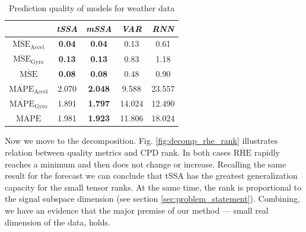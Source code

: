 \documentclass[referee, pdflatex]{sn-jnl}
\theoremstyle{definition}
\theoremstyle{plain}
\begin{document}
	\def\arraystretch{1.1}
	\begin{table}[h]
		\centering
		\caption{Prediction quality of models for weather data}\label{tab:pred_res_motion}
		\begin{tabular}{|c|c|c|c|c|}
			\hline
			& \textit{tSSA}                & \textit{mSSA} & \textit{VAR} & \textit{RNN} \\ \hline
			$ \overline{\text{MSE}}_{\text{Accel}} $  & \textbf{0.04}                        & \textbf{0.04}         & 0.13        & 0.61            \\ \hline
			$ \overline{\text{MSE}}_{\text{Gyro}} $  & \textbf{0.13}                        &\textbf{ 0.13}        & 0.83        & 1.18           \\ \hline
			$ \overline{\text{MSE}} $  & \textbf{0.08}                        & \textbf{0.08}        & 0.48       & 0.90            \\ \hline
			$ \overline{\text{MAPE}}_{\text{Accel}} $ & 2.070 & \textbf{2.048}         & 9.588        & 23.557            \\ \hline
			$ \overline{\text{MAPE}}_{\text{Gyro}} $ & 1.891 & \textbf{1.797}         & 14.024        & 12.490            \\ \hline
			$ \overline{\text{MAPE}} $       & 1.981               & \textbf{1.923}         & 11.806        & 18.024            \\ \hline
		\end{tabular}
	\end{table}
	
	Now we move to the decomposition. Fig. \ref{fig:decomp_rhe_rank} illustrates relation between quality metrics and CPD rank. In both cases $ \overline{\text{RHE}} $ rapidly reaches a minimum and then does not change or increase. Recalling the same result for the forecast we can conclude that tSSA has the greatest generalization capacity for the small tensor ranks. At the same time, the rank is proportional to the signal subspace dimension (see section \ref{sec:problem_statement}). Combining, we have an evidence that the major premise of our method --- small real dimension of the data, holds.
	
\end{document}
